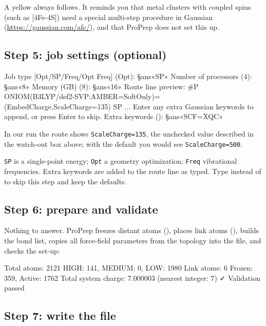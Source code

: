 A yellow  always follows. It reminds you
that metal clusters with coupled spins (such as [4Fe-4S]) need a special
multi-step procedure in Gaussian (\url{https://gaussian.com/afc/}), and that
ProPrep does not set this up.

\subsection*{Step 5: job settings (optional)}

\begin{screen}
Job type [Opt/SP/Freq/Opt Freq] (Opt): §ans«SP»
Number of processors (4): §ans«8»
Memory (GB) (8): §ans«16»
Route line preview:
  #P ONIOM(B3LYP/def2-SVP:AMBER=SoftOnly)=(EmbedCharge,ScaleCharge=135) SP ...
Enter any extra Gaussian keywords to append, or press Enter to skip.
Extra keywords (): §ans«SCF=XQC»
\end{screen}

In our run the route shows \texttt{ScaleCharge=135}, the unchecked value
described in the watch-out box above; with the default you would see
\texttt{ScaleCharge=500}.

\texttt{SP} is a single-point energy; \texttt{Opt} a geometry optimization;
\texttt{Freq} vibrational frequencies. Extra keywords are added to the route
line as typed. Type  instead of  to skip this step and keep
the defaults.

\subsection*{Step 6: prepare and validate}

Nothing to answer. ProPrep freezes distant atoms (), places link atoms (), builds the bond list, copies all force-field parameters from the
topology into the file, and checks the set-up:

\begin{screen}
  Total atoms: 2121
  HIGH: 141, MEDIUM: 0, LOW: 1980
  Link atoms: 6
  Frozen: 359, Active: 1762
  Total system charge: 7.000003 (nearest integer: 7)
✓ Validation passed
\end{screen}

\subsection*{Step 7: write the file}

